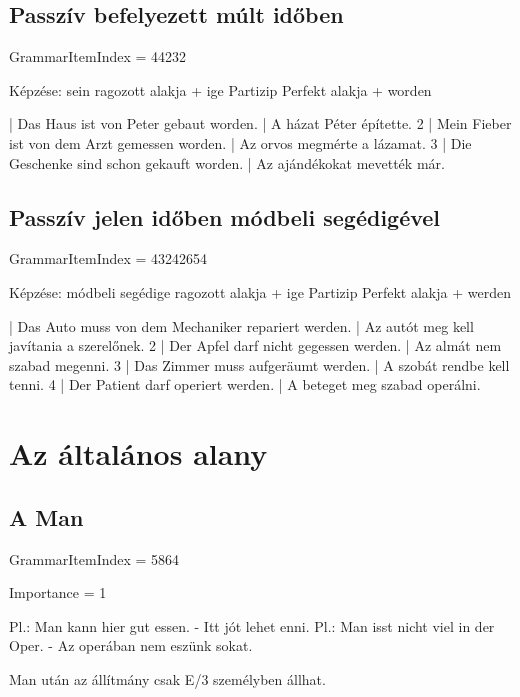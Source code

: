 \documentclass{article}
\newenvironment{desc}{\verbatim}{\endverbatim}
\newenvironment{exmp}{\verbatim}{\endverbatim}
\begin{document}
\subsection{Passzív befelyezett múlt időben}

GrammarItemIndex = 44232

\begin{desc}
Képzése: sein ragozott alakja + ige Partizip Perfekt alakja + worden
\end{desc}

\begin{exmp}
1 | Das Haus ist von Peter gebaut worden. | A házat Péter építette.
2 | Mein Fieber ist von dem Arzt gemessen worden. | Az orvos megmérte a lázamat.
3 | Die Geschenke sind schon gekauft worden. | Az ajándékokat mevették már.
\end{exmp}

\subsection{Passzív jelen időben módbeli segédigével}

GrammarItemIndex = 43242654

\begin{desc}
Képzése: módbeli segédige ragozott alakja + ige Partizip Perfekt alakja + werden
\end{desc}

\begin{exmp}
1 | Das Auto muss von dem Mechaniker repariert werden. | Az autót meg kell javítania a szerelőnek.
2 | Der Apfel darf nicht gegessen werden. | Az almát nem szabad megenni.
3 | Das Zimmer muss aufgeräumt werden. | A szobát rendbe kell tenni.
4 | Der Patient darf operiert werden. | A beteget meg szabad operálni.
\end{exmp}

\section{Az általános alany}

\subsection{A Man}

GrammarItemIndex = 5864

Importance = 1

\begin{desc}
Pl.: Man kann hier gut essen. - Itt jót lehet enni.
Pl.: Man isst nicht viel in der Oper. - Az operában nem eszünk sokat. 

Man után az állítmány csak E/3 személyben állhat.
\end{desc}
\end{document}

